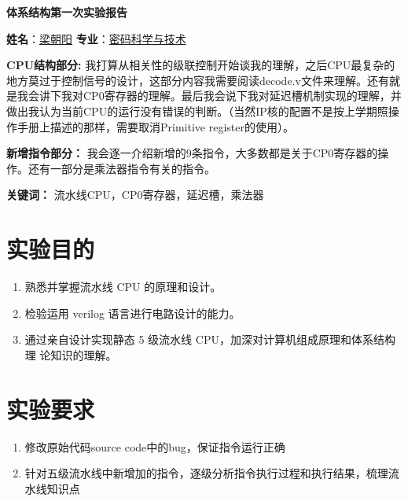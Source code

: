 \documentclass[a4paper]{article}
\begin{document}
\renewcommand{\figurename}{图}
\renewcommand{\contentsname}{目录}  
\renewcommand{\abstractname}{\textbf{\Large 摘要}} 

\begin{center}
    \huge{\textbf{体系结构第一次实验报告}}
\end{center}

\begin{center}
    \textbf{姓名}：\underline{梁朝阳} \quad
    \textbf{专业}：\underline{密码科学与技术}
\end{center}

\tableofcontents

\vspace*{1cm}


\vspace{1em}

\textbf{CPU结构部分:} 我打算从相关性的级联控制开始谈我的理解，之后CPU最复杂的地方莫过于控制信号的设计，这部分内容我需要阅读decode.v文件来理解。还有就是我会讲下我对CP0寄存器的理解。最后我会说下我对延迟槽机制实现的理解，并做出我认为当前CPU的运行没有错误的判断。（当然IP核的配置不是按上学期照操作手册上描述的那样，需要取消Primitive register的使用）。

\textbf{新增指令部分：} 我会逐一介绍新增的9条指令，大多数都是关于CP0寄存器的操作。还有一部分是乘法器指令有关的指令。

\vspace{1em}
\noindent\textbf{关键词：} 流水线CPU，CP0寄存器，延迟槽，乘法器
\newpage


\section{实验目的}

\begin{enumerate}
    \item 熟悉并掌握流水线 CPU 的原理和设计。
    \item 检验运用 verilog 语言进行电路设计的能力。
    \item 通过亲自设计实现静态 5 级流水线 CPU，加深对计算机组成原理和体系结构理
    论知识的理解。
\end{enumerate}

\section{实验要求}

\begin{enumerate}
    \item 修改原始代码source code中的bug，保证指令运行正确
    \item 针对五级流水线中新增加的指令，逐级分析指令执行过程和执行结果，梳理流水线知识点
\end{enumerate}
\end{document}

